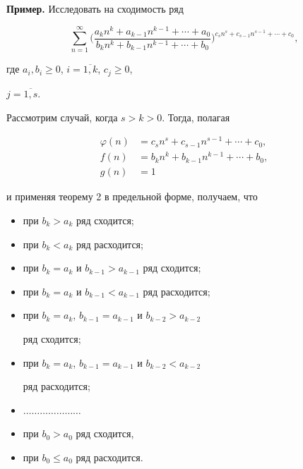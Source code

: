 {\bf Пример.} Исследовать на сходимость ряд


$$


\sum_{n=1}^{\infty}\bigg( \frac{a_k n^k+a_{k-1} n^{k-1}+\dotsb +a_0}{


b_kn^k +b_{k-1}n^{k-1}+\dotsb +b_0} \bigg)


^{c_sn^s+c_{s-1}n^{s-1}+\dotsb +c_0},


$$


где $a_i,b_i\geq 0$, $i=\overline{1,k}$, $c_j\geq0$,


$j=\overline{1,s}$.





Рассмотрим случай, когда $s>k>0$. Тогда, полагая


\begin{align*}


\varphi (n)&=c_sn^s+c_{s-1}n^{s-1}+\dotsb +c_0,\\


f(n)&=b_kn^k +b_{k-1}n^{k-1}+\dotsb +b_0,\\


g(n)&=1


\end{align*}


и применяя теорему 2 в предельной форме, получаем, что


\begin{itemize}


\item[1)] при $b_k>a_k$ ряд сходится;


\item[2)] при $b_k<a_k$ ряд расходится;


\item[3)] при $b_k=a_k$ и $b_{k-1}>a_{k-1}$ ряд сходится;


\item[\phantom{3)}] при $b_k=a_k$ и $b_{k-1}<a_{k-1}$ ряд расходится;


\item[\phantom{3)}] при $b_k=a_k$, $b_{k-1}=a_{k-1}$ и $b_{k-2}>a_{k-2}$


ряд сходится;


\item[\phantom{3)}] при $b_k=a_k$, $b_{k-1}=a_{k-1}$ и $b_{k-2}<a_{k-2}$


ряд расходится;


\item[\phantom{3)}] $\dotsc\dotsc\dotsc\dotsc\dotsc\dotsc\dotsc$


\item[\phantom{3)}] при $b_0>a_0$ ряд сходится,


\item[\phantom{3)}] при $b_0 \leq a_0$ ряд расходится.


\end{itemize}


